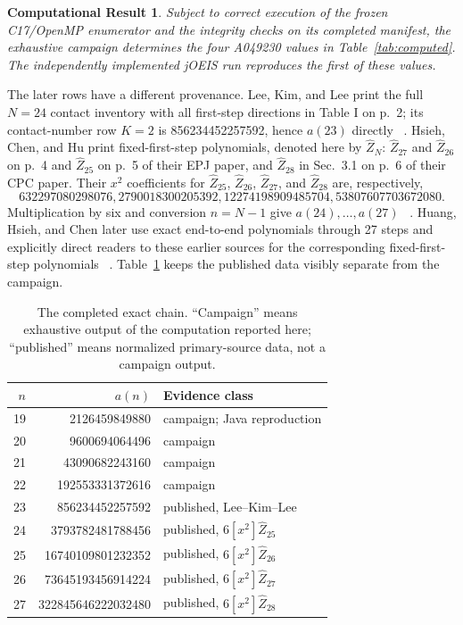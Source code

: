 \documentclass[11pt]{article}
\newtheorem{computationalresult}[theorem]{Computational Result}
\theoremstyle{definition}
\theoremstyle{remark}
\begin{document}
\begin{computationalresult}
Subject to correct execution of the frozen C17/OpenMP enumerator and the
integrity checks on its completed manifest, the exhaustive campaign determines
the four A049230 values in Table~\ref{tab:computed}.  The independently
implemented jOEIS run reproduces the first of these values.
\end{computationalresult}

The later rows have a different provenance.  Lee, Kim, and Lee print the full
$N=24$ contact inventory with all first-step directions in Table I on p.~2;
its contact-number row $K=2$ is 856234452257592, hence $a(23)$ directly~
\cite{LeeEtAl2012}.  Hsieh, Chen, and Hu print fixed-first-step polynomials,
denoted here by $\widehat Z_N$: $\widehat Z_{27}$ and $\widehat Z_{26}$ on p.~4
and $\widehat Z_{25}$ on p.~5 of their EPJ paper, and $\widehat Z_{28}$ in
Sec.~3.1 on p.~6 of their CPC paper.  Their $x^2$ coefficients for
$\widehat Z_{25}$, $\widehat Z_{26}$, $\widehat Z_{27}$, and
$\widehat Z_{28}$ are, respectively,
\[
632297080298076,
2790018300205392,
12274198909485704,
53807607703672080.
\]
Multiplication by six and conversion $n=N-1$ give $a(24),\ldots,a(27)$~
\cite{HsiehEtAl2016EPJ,HsiehEtAl2016CPC}.  Huang, Hsieh, and Chen later use
exact end-to-end polynomials through 27 steps and explicitly direct readers to
these earlier sources for the corresponding fixed-first-step polynomials~
\cite[Appendix A]{HuangEtAl2022}.  Table~\ref{tab:chain} keeps the published
data visibly separate from the campaign.

\begin{table}[ht]
\centering
\caption{The completed exact chain.  ``Campaign'' means exhaustive output of
the computation reported here; ``published'' means normalized primary-source
data, not a campaign output.}
\label{tab:chain}
\begin{tabular}{r@{\quad}r@{\quad}l}
\toprule
$n$ & $a(n)$ & Evidence class \\
\midrule
19 & 2126459849880       & campaign; Java reproduction \\
20 & 9600694064496       & campaign \\
21 & 43090682243160      & campaign \\
22 & 192553331372616     & campaign \\
23 & 856234452257592     & published, Lee--Kim--Lee \\
24 & 3793782481788456    & published, $6[x^2]\widehat Z_{25}$ \\
25 & 16740109801232352   & published, $6[x^2]\widehat Z_{26}$ \\
26 & 73645193456914224   & published, $6[x^2]\widehat Z_{27}$ \\
27 & 322845646222032480  & published, $6[x^2]\widehat Z_{28}$ \\
\bottomrule
\end{tabular}
\end{table}
\end{document}
